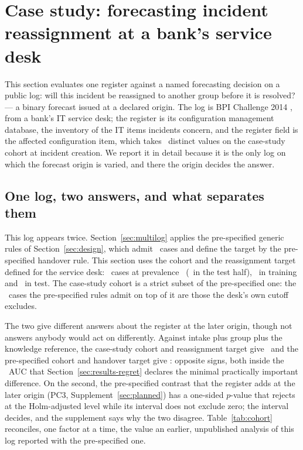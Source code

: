 \section{Case study: forecasting incident reassignment at a bank's service desk}
\label{sec:cmdb}

This section evaluates one register against a named forecasting decision on
a public log: will this incident be reassigned to another group before it is
resolved? --- a binary forecast issued at a declared origin. The log is BPI
Challenge 2014 \citep{vandongen2014bpic}, from a bank's IT service desk; the
register is its configuration management database, the inventory of the IT
items incidents concern, and the register field is the affected
configuration item, which takes \cardTauTwo\ distinct values on the
case-study cohort at incident creation. We report it in detail because it is
the only log on which the forecast origin is varied, and there the origin
decides the answer.

\subsection{One log, two answers, and what separates them}
\label{sec:cohort}

This log appears twice. Section~\ref{sec:multilog} applies the pre-specified
generic rules of Section~\ref{sec:design}, which admit \nRegisteredCohort\
cases and define the target by the pre-specified handover rule. This section
uses the cohort and the reassignment target defined for the service desk:
\nCohort\ cases at prevalence \casePrevalence\ (\casePrevalenceTest\ in the
test half), \nCaseTrain\ in training and \nCaseTest\ in test. The case-study
cohort is a strict subset of the pre-specified one: the \nExtraCases\ cases
the pre-specified rules admit on top of it are those the desk's own cutoff
excludes.

The two give different answers about the register at the later origin,
though not answers anybody would act on differently. Against intake plus group
plus the knowledge reference, the case-study cohort and reassignment target
give \VTtwoKnow\ and the pre-specified cohort and handover target give
\VregisteredTauTwo: opposite signs, both inside the \mpidAuc\ AUC that
Section~\ref{sec:results-regret} declares the minimal practically important
difference. On the second, the pre-specified contrast that the register
adds at the later origin (\textsf{PC3}, Supplement~\ref{sec:planned}) has a one-sided
$p$-value that rejects at the Holm-adjusted level while its interval does not
exclude zero; the interval decides, and the supplement says why the two
disagree. Table~\ref{tab:cohort} reconciles, one factor at a time, the
value an earlier, unpublished analysis of this log reported with the
pre-specified one.

